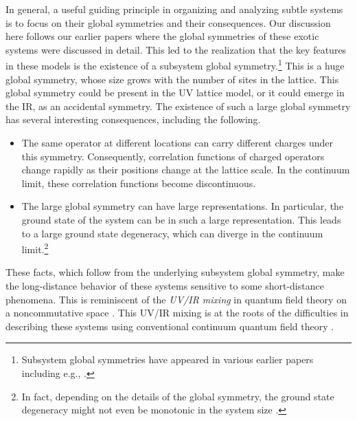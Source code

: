 \documentclass[12pt]{article}
\numberwithin{equation}{section}
\begin{document}
In general, a useful guiding principle in organizing and analyzing subtle systems is to focus on their global symmetries and their consequences.  Our discussion here follows our earlier papers \cite{Seiberg:2019vrp,paper1,paper2,paper3,Gorantla:2020xap,Gorantla:2020jpy,Rudelius:2020kta,Gorantla:2021svj} where the global symmetries of these exotic systems were discussed in detail.  This led to the realization that the key features in these models is the existence of a subsystem global symmetry.\footnote{Subsystem global symmetries have appeared in various earlier papers including e.g., \cite{PhysRevLett.85.2160}.}
This is a huge global symmetry, whose size grows with the number of sites in the lattice.  This global symmetry could be present in the UV lattice model, or it could emerge in the IR, as an accidental symmetry.
The existence of such a large global symmetry has several interesting consequences, including the following.
\begin{itemize}
\item The same operator at different locations can carry different charges under this symmetry.  Consequently,  correlation functions of charged operators change rapidly as their positions change at the lattice scale.  In the continuum limit, these correlation functions become discontinuous.
\item The large global symmetry can have large representations.  In particular, the ground state of the system can be in such a large representation.  This leads to a large ground state degeneracy, which can diverge in the continuum limit.\footnote{In fact, depending on the details of the global symmetry, the ground state degeneracy might not even be monotonic in the system size \cite{PhysRevA.83.042330,Shirley:2017suz,Slagle:2018wyl,Dua:2019ucj,1821601,Meng,Manoj:2020wwy,Rudelius:2020kta}.}
\end{itemize}

These facts, which follow from the underlying subsystem global symmetry, make the long-distance behavior of these systems sensitive to some short-distance phenomena. This is reminiscent of the {\it UV/IR mixing} in quantum field theory on a noncommutative space \cite{Minwalla:1999px}.  This UV/IR mixing is at the roots of the difficulties in describing these systems using conventional continuum quantum field theory \cite{paper1,paper2,paper3,Gorantla:2020xap,Slagle:2020ugk,Gorantla:2020jpy,Rudelius:2020kta, You:2021tmm,Gorantla:2021svj,Zhou:2021wsv,Hsin:2021mjn,You:2021sou,Casalbuoni:2021fel}.
\end{document}

